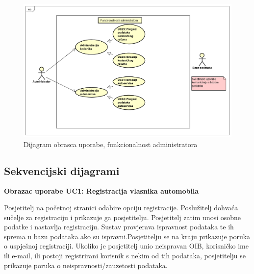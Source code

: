 \begin{figure}[H]
	\includegraphics[width=\linewidth]{dijagrami/diagram2.png}
	\centering
	\caption{Dijagram obrasca uporabe, funkcionalnost administratora}
	\label{fig:diagram2}
\end{figure}


\eject

\subsection{Sekvencijski dijagrami}


\textbf{Obrazac uporabe UC1: Registracija vlasnika automobila}

\noindent Posjetitelj na početnoj stranici odabire opciju registracije. Poslužitelj dohvaća sučelje za registraciju i prikazuje ga posjetitelju. Posjetitelj zatim unosi osobne podatke i nastavlja registraciju. Sustav provjerava ispravnost podataka te ih sprema u bazu podataka ako su ispravni.Posjetitelju se na kraju prikazuje poruka o uspješnoj registraciji. Ukoliko je posjetitelj unio neispravan OIB, korisničko ime ili e-mail, ili postoji registrirani korisnik s nekim od tih podataka, posjetitelju se prikazuje poruka o neispravnosti/zauzetosti podataka.

